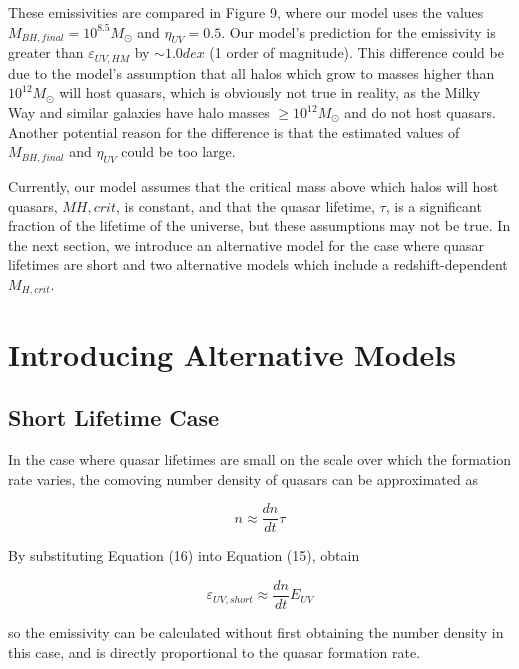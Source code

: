 \documentclass[12pt, twocolumn]{article}%
\begin{document}
\twocolumngrid


These emissivities are compared in Figure 9, where our model uses the values $M_{BH,final}=10^{8.5}M_\odot$ and $\eta_{UV}=0.5$. Our model's prediction for the emissivity is greater than $\varepsilon_{UV,HM}$ by $\sim1.0dex$ (1 order of magnitude). This difference could be due to the model's assumption that all halos which grow to masses higher than $10^12M_\odot$ will host quasars, which is obviously not true in reality, as the Milky Way and similar galaxies have halo masses $\geq10^{12}M_\odot$ and do not host quasars. Another potential reason for the difference is that the estimated values of $M_{BH,final}$ and $\eta_{UV}$ could be too large.\par

Currently, our model assumes that the critical mass above which halos will host quasars, $M{H,crit}$, is constant, and that the quasar lifetime, $\tau$, is a significant fraction of the lifetime of the universe, but these assumptions may not be true. In the next section, we introduce an alternative model for the case where quasar lifetimes are short and two alternative models which include a redshift-dependent $M_{H,crit}$.

\section{Introducing Alternative Models}

\subsection{Short Lifetime Case}

In the case where quasar lifetimes are small on the scale over which the formation rate varies, the comoving number density of quasars can be approximated as

\begin{equation}
    n\approx\frac{dn}{dt}\tau
\end{equation}

\noindent By substituting Equation (16) into Equation (15), obtain

\begin{equation}
    \varepsilon_{UV,short}\approx\frac{dn}{dt}E_{UV}
\end{equation}

\noindent so the emissivity can be calculated without first obtaining the number density in this case, and is directly proportional to the quasar formation rate.\par
\end{document}
